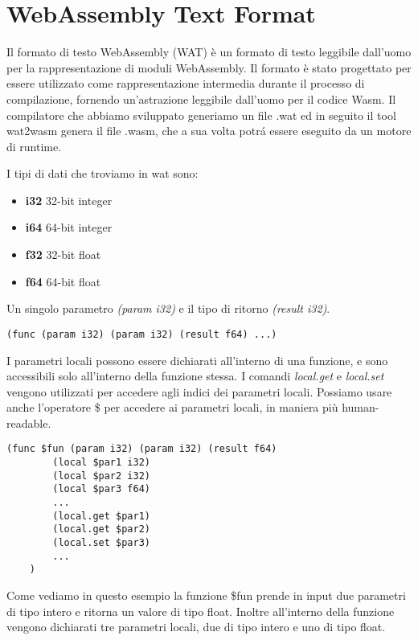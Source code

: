 \documentclass[../../main.tex]{subfiles}
\begin{document}
\section{WebAssembly Text Format}
Il formato di testo WebAssembly (WAT) \cite{WebAssemblyTextFormat} è un formato di testo leggibile dall'uomo per la rappresentazione di moduli WebAssembly. Il formato è stato progettato per essere utilizzato come rappresentazione intermedia durante il processo di compilazione, fornendo un'astrazione leggibile dall'uomo per il codice Wasm.
Il compilatore che abbiamo sviluppato generiamo un file .wat ed in seguito il tool wat2wasm \cite{jain2022webassembly} genera il file .wasm, che a sua volta potrá essere eseguito da un motore di runtime.

I tipi di dati che troviamo in wat sono:
\begin{itemize}
    \item \textbf{i32} 32-bit integer
    \item \textbf{i64} 64-bit integer
    \item \textbf{f32} 32-bit float
    \item \textbf{f64} 64-bit float
\end{itemize}
Un singolo  parametro \textit{(param i32)} e il tipo di ritorno \textit{(result i32)}.
\begin{lstlisting}[language=WebAssembly, caption={Esempio di funzione in wat}, label={lst:funzioneWat}]
    (func (param i32) (param i32) (result f64) ...)
\end{lstlisting}
I parametri locali possono essere dichiarati all'interno di una funzione, e sono accessibili solo all'interno della funzione stessa.
I comandi \textit{local.get} e \textit{local.set} vengono utilizzati per accedere agli indici dei parametri locali.
Possiamo usare anche l'operatore \$ per accedere ai parametri locali, in maniera più human-readable.
\begin{lstlisting}[language=WebAssembly, caption={Esempio di funzione in wat}, label={lst:funzioneWat}]
    (func $fun (param i32) (param i32) (result f64)
        (local $par1 i32)
        (local $par2 i32)
        (local $par3 f64)
        ...
        (local.get $par1)
        (local.get $par2)
        (local.set $par3)
        ...
    )
\end{lstlisting}
Come vediamo in questo esempio la funzione \$fun prende in input due parametri di tipo intero e ritorna un valore di tipo float. Inoltre all'interno della funzione vengono dichiarati tre parametri locali, due di tipo intero e uno di tipo float.
\end{document}
